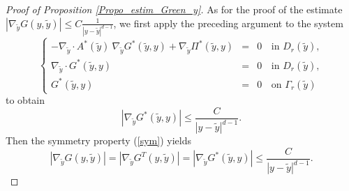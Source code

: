 \documentclass[11pt, reqno]{amsart}
\theoremstyle{definition}
\theoremstyle{remark}
\numberwithin{equation}{section}
\begin{document}
\begin{appendices}
\begin{proof}[Proof of \textup{Proposition \ref{Propo_estim_Green_y}}]
		
		\noindent 	As for the proof of the estimate $| \nabla_{\tilde{y}} G(y,\tilde{y})| \leq C  \frac{1 }{|y-\tilde{y}|^{d-1}}$,  we first  apply the preceding argument to the system
		\begin{equation}
			\left\{
			\begin{array}{rcll}
				-\nabla_{\tilde{y}}\cdot A^* (\tilde{y}) \: \nabla_{\tilde{y}} G^*(\tilde{y},y) +  \nabla_{\tilde{y}} \Pi^*(\tilde{y},y)&=& 0 &\mbox{in }  D_r( \tilde{y}),\\
				\nabla_{\tilde{y}} \cdot G^*(\tilde{y},y)&=& 0 \,  &\mbox{in } D_r( \tilde{y} ),\\
				G^*(\tilde{y},y) &=& 0 \,  &\mbox{on } \Gamma_r(\tilde{y})
			\end{array}
			\right.  
		\end{equation}	
		to obtain
		\begin{equation*}
			|\nabla_{\tilde{y}} G^*(\tilde{y},y)| \leq \frac{C }{|y-\tilde{y}|^{d-1}}.
		\end{equation*}
		Then the symmetry property	(\ref{sym}) yields 
		\begin{equation}\label{estimtild}
			|\nabla_{\tilde{y}} G(y,\tilde{y})| =|\nabla_{\tilde{y}} G^T\!(y,\tilde{y})|
			=|\nabla_{\tilde{y}} G^*(\tilde{y},y)| \leq \frac{C }{|y-\tilde{y}|^{d-1}}.
		\end{equation}
		

\end{proof}
\end{appendices}
\end{document}
